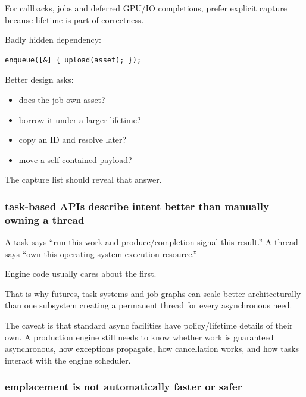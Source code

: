 For callbacks, jobs and deferred GPU/IO completions, prefer explicit capture because lifetime is part of correctness.

Badly hidden dependency:

\begin{verbatim}
enqueue([&] { upload(asset); });
\end{verbatim}

Better design asks:

\begin{itemize}
\tightlist
\item
  does the job own asset?
\item
  borrow it under a larger lifetime?
\item
  copy an ID and resolve later?
\item
  move a self-contained payload?
\end{itemize}

The capture list should reveal that answer.

\subsubsection{task-based APIs describe intent better than manually owning a thread}\label{01-foundations-i-ch005-task-based-apis-describe-intent-better-than-manually-owning-a-thread}

\hypertarget{01-foundations-i-ch005-task-based-apis-describe-intent-better-than-manually-owning-a-thread}{}

A task says ``run this work and produce/completion-signal this result.'' A thread says ``own this operating-system execution resource.''

Engine code usually cares about the first.

That is why futures, task systems and job graphs can scale better architecturally than one subsystem creating a permanent thread for every asynchronous need.

The caveat is that standard async facilities have policy/lifetime details of their own. A production engine still needs to know whether work is guaranteed asynchronous, how exceptions propagate, how cancellation works, and how tasks interact with the engine scheduler.

\subsubsection{emplacement is not automatically faster or safer}\label{01-foundations-i-ch005-emplacement-is-not-automatically-faster-or-safer}

